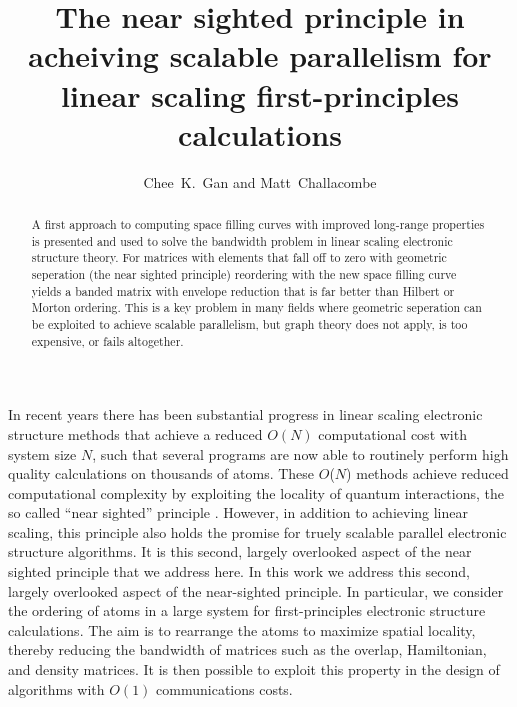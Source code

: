 \documentclass[preprint,showpacs,amssymb,aps]{revtex4}
\begin{document}
\title{The near sighted principle in acheiving scalable parallelism for linear scaling first-principles calculations
}
\author{Chee~K.~Gan and Matt~Challacombe
}
 
\begin{abstract}
A first approach to computing space filling curves with improved long-range 
properties is presented and used to solve the bandwidth problem in linear scaling 
electronic structure theory.  For matrices with elements that fall off to zero 
with geometric seperation (the near sighted principle) reordering with the new space 
filling curve yields a banded matrix with envelope reduction that is far better 
than Hilbert or Morton ordering.  This is a key problem in many fields where geometric 
seperation can be exploited to achieve scalable parallelism, but graph theory does not 
apply, is too expensive, or fails altogether.

\end{abstract}
\maketitle


In recent years there has been substantial progress in linear scaling electronic structure methods
that achieve a reduced $O(N)$ computational cost with system size $N$, such that several programs
\cite{SIESTA,MONDO,Gaussian,?} are now able to routinely perform high quality calculations on thousands of atoms.
These $O$($N$) methods achieve reduced computational complexity by exploiting the locality of quantum 
interactions, the so called ``near sighted'' principle \cite{Kohn_96v76}.  However, in addition to 
achieving linear scaling, this principle also holds the promise for truely scalable parallel 
electronic structure algorithms.   It is this second, largely overlooked aspect of the near sighted
principle that we address here. In this work we address this second,  largely overlooked aspect of the 
near-sighted principle.   In particular, we consider the ordering of atoms in a large system for 
first-principles electronic structure calculations.   The aim is to rearrange the atoms to maximize spatial 
locality, thereby reducing the bandwidth of matrices such as the overlap,  Hamiltonian, and density matrices. 
It is then possible to exploit this property in the design of algorithms with $O(1)$ communications costs.  
\end{document}
